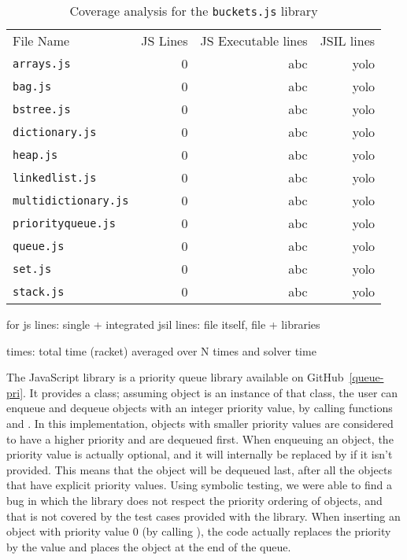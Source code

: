 \begin{table*}[h]
{
\small
\begin{tabular}{lrrr}
\toprule
File Name & JS Lines & JS Executable lines & JSIL lines \\
\cmidrule{1-1} \cmidrule{3-3}
\texttt{arrays.js} & 0 & abc & yolo\\
\texttt{bag.js} & 0 & abc & yolo\\
\texttt{bstree.js} & 0 & abc & yolo\\
\texttt{dictionary.js} & 0 & abc & yolo\\
\texttt{heap.js} & 0 & abc & yolo\\
\texttt{linkedlist.js} & 0 & abc & yolo\\
\texttt{multidictionary.js} & 0 & abc & yolo\\
\texttt{priorityqueue.js} & 0 & abc & yolo\\
\texttt{queue.js} & 0 & abc & yolo\\
\texttt{set.js} & 0 & abc & yolo\\
\texttt{stack.js} & 0 & abc & yolo\\
\bottomrule
\end{tabular}
}
\caption{Coverage analysis for the \texttt{buckets.js} library}
\end{table*}
\FloatBarrier

for js lines: single + integrated
jsil lines: file itself, file + libraries

times: total time (racket) averaged over N times and solver time


The JavaScript  library is a priority queue library available on GitHub~\ref{queue-pri}.
It provides a  class; assuming object  is an instance of that class, the user can enqueue and dequeue objects with an integer priority value, by calling functions  and .
In this implementation, objects with smaller priority values are considered to have a higher priority and are dequeued first.
When enqueuing an object, the priority value is actually optional, and it will internally be replaced by  if it isn't provided.
This means that the object will be dequeued last, after all the objects that have explicit priority values.
Using \cosette symbolic testing, we were able to find a bug in which the library does not respect the priority ordering of objects, and that is not covered by the test cases provided with the library.
When inserting an object with priority value $0$ (by calling ), the code actually replaces the priority by the  value and places the object at the end of the queue.

